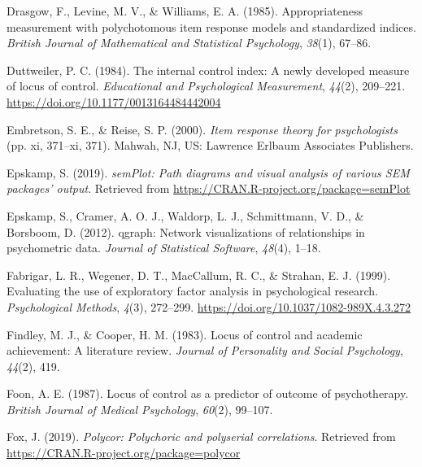 \documentclass[
  man]{apa6}
\newlength{\cslhangindent}
\newlength{\cslentryspacingunit} %
\newenvironment{CSLReferences}[2] %
 {%
  \setlength{\parindent}{0pt}
  \ifodd #1
  \let\oldpar\par
  \def\par{\hangindent=\cslhangindent\oldpar}
  \fi
  \setlength{\parskip}{#2\cslentryspacingunit}
 }%
 {}
\begin{document}
\begin{CSLReferences}{1}{0}
\leavevmode{}%
Drasgow, F., Levine, M. V., \& Williams, E. A. (1985). Appropriateness measurement with polychotomous item response models and standardized indices. \emph{British Journal of Mathematical and Statistical Psychology}, \emph{38}(1), 67--86.

\leavevmode{}%
Duttweiler, P. C. (1984). The internal control index: A newly developed measure of locus of control. \emph{Educational and Psychological Measurement}, \emph{44}(2), 209--221. \url{https://doi.org/10.1177/0013164484442004}

\leavevmode{}%
Embretson, S. E., \& Reise, S. P. (2000). \emph{Item response theory for psychologists} (pp. xi, 371--xi, 371). Mahwah, NJ, US: Lawrence Erlbaum Associates Publishers.

\leavevmode{}%
Epskamp, S. (2019). \emph{semPlot: Path diagrams and visual analysis of various SEM packages' output}. Retrieved from \url{https://CRAN.R-project.org/package=semPlot}

\leavevmode{}%
Epskamp, S., Cramer, A. O. J., Waldorp, L. J., Schmittmann, V. D., \& Borsboom, D. (2012). {qgraph}: Network visualizations of relationships in psychometric data. \emph{Journal of Statistical Software}, \emph{48}(4), 1--18.

\leavevmode{}%
Fabrigar, L. R., Wegener, D. T., MacCallum, R. C., \& Strahan, E. J. (1999). Evaluating the use of exploratory factor analysis in psychological research. \emph{Psychological Methods}, \emph{4}(3), 272--299. \url{https://doi.org/10.1037/1082-989X.4.3.272}

\leavevmode{}%
Findley, M. J., \& Cooper, H. M. (1983). Locus of control and academic achievement: A literature review. \emph{Journal of Personality and Social Psychology}, \emph{44}(2), 419.

\leavevmode{}%
Foon, A. E. (1987). Locus of control as a predictor of outcome of psychotherapy. \emph{British Journal of Medical Psychology}, \emph{60}(2), 99--107.

\leavevmode{}%
Fox, J. (2019). \emph{Polycor: Polychoric and polyserial correlations}. Retrieved from \url{https://CRAN.R-project.org/package=polycor}


\end{CSLReferences}
\end{document}
